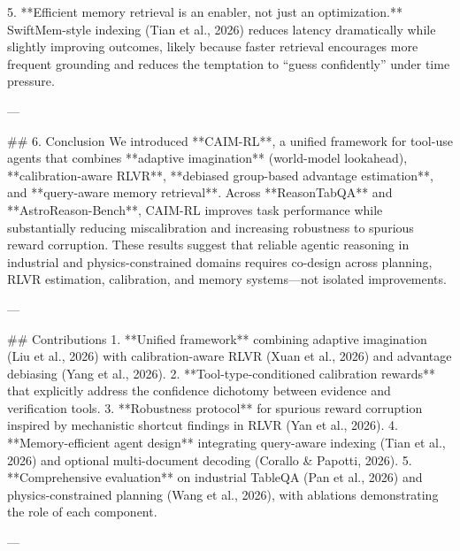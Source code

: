 5. **Efficient memory retrieval is an enabler, not just an optimization.**  
   SwiftMem-style indexing (Tian et al., 2026) reduces latency dramatically while slightly improving outcomes, likely because faster retrieval encourages more frequent grounding and reduces the temptation to “guess confidently” under time pressure.

---

## 6. Conclusion  
We introduced **CAIM-RL**, a unified framework for tool-use agents that combines **adaptive imagination** (world-model lookahead), **calibration-aware RLVR**, **debiased group-based advantage estimation**, and **query-aware memory retrieval**. Across **ReasonTabQA** and **AstroReason-Bench**, CAIM-RL improves task performance while substantially reducing miscalibration and increasing robustness to spurious reward corruption. These results suggest that reliable agentic reasoning in industrial and physics-constrained domains requires co-design across planning, RLVR estimation, calibration, and memory systems—not isolated improvements.

---

## Contributions  
1. **Unified framework** combining adaptive imagination (Liu et al., 2026) with calibration-aware RLVR (Xuan et al., 2026) and advantage debiasing (Yang et al., 2026).  
2. **Tool-type-conditioned calibration rewards** that explicitly address the confidence dichotomy between evidence and verification tools.  
3. **Robustness protocol** for spurious reward corruption inspired by mechanistic shortcut findings in RLVR (Yan et al., 2026).  
4. **Memory-efficient agent design** integrating query-aware indexing (Tian et al., 2026) and optional multi-document decoding (Corallo & Papotti, 2026).  
5. **Comprehensive evaluation** on industrial TableQA (Pan et al., 2026) and physics-constrained planning (Wang et al., 2026), with ablations demonstrating the role of each component.

---